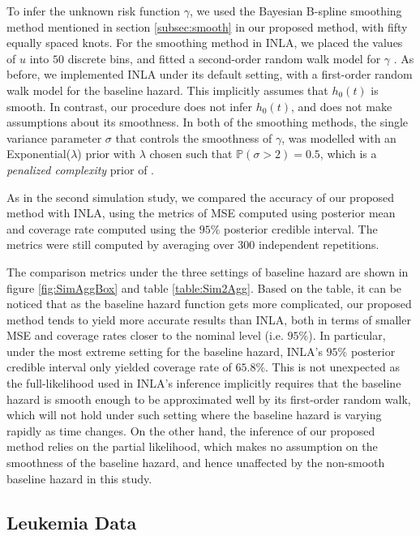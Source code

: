 \documentclass[ba]{imsart}
\begin{document}
To infer the unknown risk function $\gamma$, we used the Bayesian B-spline smoothing method mentioned in section \ref{subsec:smooth} in our proposed method, with fifty equally spaced knots. For the smoothing method in INLA, we placed the values of $u$ into $50$ discrete bins, and fitted a second-order random walk model for $\gamma$ \citep{rw2}. As before, we implemented INLA under its default setting, with a first-order random walk model for the baseline hazard. This implicitly assumes that $h_{0}(t)$ is smooth. In contrast, our procedure does not infer $h_{0}(t)$, and does not make assumptions about its smoothness. In both of the smoothing methods, the single variance parameter $\sigma$ that controls the smoothness of $\gamma$, was modelled with an Exponential($\lambda$) prior with $\lambda$ chosen such that $\mathbb{P}\left( \sigma > 2\right) = 0.5$, which is a \emph{penalized complexity} prior of \cite{pcprior}.

As in the second simulation study, we compared the accuracy of our proposed method with INLA, using the metrics of MSE computed using posterior mean and coverage rate computed using the $95\%$ posterior credible interval. The metrics were still computed by averaging over 300 independent repetitions.

The comparison metrics under the three settings of baseline hazard are shown in figure \ref{fig:SimAggBox} and table \ref{table:Sim2Agg}. Based on the table, it can be noticed that as the baseline hazard function gets more complicated, our proposed method tends to yield more accurate results than INLA, both in terms of smaller MSE and coverage rates closer to the nominal level (i.e. $95\%$). In particular, under the most extreme setting for the baseline hazard, INLA's $95\%$ posterior credible interval only yielded coverage rate of $65.8\%$. This is not unexpected as the full-likelihood used in INLA's inference implicitly requires that the baseline hazard is smooth enough to be approximated well by its first-order random walk, which will not hold under such setting where the baseline hazard is varying rapidly as time changes. On the other hand, the inference of our proposed method relies on the partial likelihood, which makes no assumption on the smoothness of the baseline hazard, and hence unaffected by the non-smooth baseline hazard in this study.

\subsection{Leukemia Data}\label{subsec:leuk}
\end{document}
